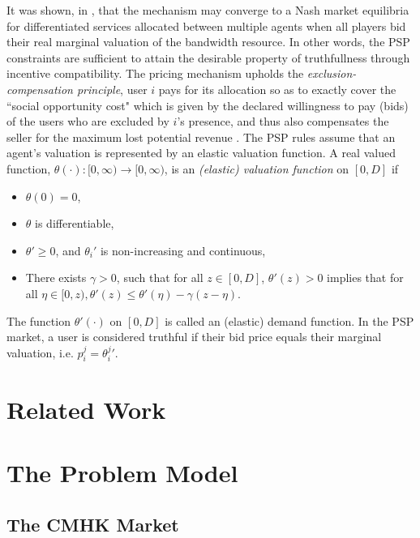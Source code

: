\documentclass[12pt]{article}
\theoremstyle{definition}
\begin{document}
\begin{multicols}{2}
It was shown, in \cite{lazar}, that the mechanism may converge to a Nash market
equilibria for differentiated services
allocated between multiple agents when all players bid their real marginal valuation
of the bandwidth resource. In other words, the PSP constraints are
sufficient to attain the desirable property of truthfullness through incentive
compatibility. The pricing mechanism upholds the \emph{exclusion-compensation
principle}, user $i$
pays for its allocation so as to exactly cover the ``social opportunity cost"
which is given by the declared willingness to pay (bids) of the users who are
excluded by $i$'s presence, and thus also compensates the seller for the maximum lost potential
revenue \cite{lazar}.
The PSP rules assume that an agent's valuation is represented by an elastic valuation function.
A real valued function, $\theta(\cdot): [0,\infty) \rightarrow [0,\infty)$, is an \emph{(elastic) valuation
function} on $[0, D]$ if 
\begin{itemize}
    \item $\theta(0) = 0$,
    \item $\theta$ is differentiable,
    \item ${\theta}' \ge 0$, and ${\theta_i}'$ is non-increasing and continuous,
     \item There exists $\gamma > 0$, such that for all $z \in [0,D]$,
${\theta}'(z) > 0$ implies that for all $\eta \in [0, z), {\theta}'(z) \le
{\theta}'(\eta)
- \gamma(z - \eta)$. 
\end{itemize}
The function $\theta'(\cdot)$ on $[0, D]$ is called an (elastic) demand
function.
In the PSP market, a
user is considered truthful if their bid price equals their marginal valuation,
i.e. $p_i^j = {\theta_i^j}'$.


\section{Related Work}

\section{The Problem Model}


\subsection{The CMHK Market}


\end{multicols}
\end{document}
